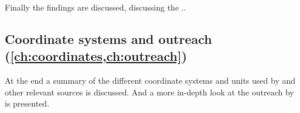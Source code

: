 Finally the findings are discussed, discussing the ..


\subsection{Coordinate systems and outreach 
            (\cref{ch:coordinates,ch:outreach})}

At the end a summary of the different coordinate systems and units used by \hisparc and other relevant sources is discussed. And a more in-depth look at the outreach by \hisparc is presented.
















